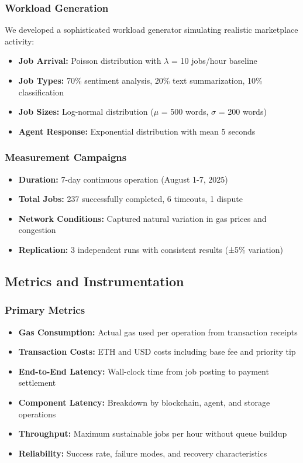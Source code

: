 \subsubsection{Workload Generation}
We developed a sophisticated workload generator simulating realistic marketplace activity:
\begin{itemize}
    \item \textbf{Job Arrival:} Poisson distribution with $\lambda$ = 10 jobs/hour baseline
    \item \textbf{Job Types:} 70\% sentiment analysis, 20\% text summarization, 10\% classification
    \item \textbf{Job Sizes:} Log-normal distribution ($\mu$ = 500 words, $\sigma$ = 200 words)
    \item \textbf{Agent Response:} Exponential distribution with mean 5 seconds
\end{itemize}

\subsubsection{Measurement Campaigns}
\begin{itemize}
    \item \textbf{Duration:} 7-day continuous operation (August 1-7, 2025)
    \item \textbf{Total Jobs:} 237 successfully completed, 6 timeouts, 1 dispute
    \item \textbf{Network Conditions:} Captured natural variation in gas prices and congestion
    \item \textbf{Replication:} 3 independent runs with consistent results (±5\% variation)
\end{itemize}

\subsection{Metrics and Instrumentation}

\subsubsection{Primary Metrics}
\begin{itemize}
    \item \textbf{Gas Consumption:} Actual gas used per operation from transaction receipts
    \item \textbf{Transaction Costs:} ETH and USD costs including base fee and priority tip
    \item \textbf{End-to-End Latency:} Wall-clock time from job posting to payment settlement
    \item \textbf{Component Latency:} Breakdown by blockchain, agent, and storage operations
    \item \textbf{Throughput:} Maximum sustainable jobs per hour without queue buildup
    \item \textbf{Reliability:} Success rate, failure modes, and recovery characteristics
\end{itemize}

